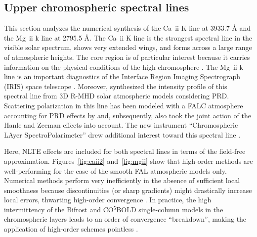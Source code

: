 \documentclass[iop,numberedappendix,twocolappendix,twocolumn]{emulateapj}
\begin{document}
\subsection{Upper chromospheric spectral lines}\label{subsec:5.3}
%
This section analyzes the numerical synthesis of the Ca~{\sc ii} K line at 3933.7 {\rm \AA} and the Mg~{\sc ii} k line at 2795.5 {\rm \AA}.
The Ca~{\sc ii} K line is the strongest spectral line in the visible solar spectrum,
shows very extended wings, and forms across a large range of atmospheric heights.
The core region is of particular interest because it carries information on the physical conditions of the high chromosphere
\citep[e.g.,][]{solanki1991,carlsson1997,solanki2004,anusha2013,bjorgen2018}.
The Mg~{\sc ii} k line is an important diagnostics of 
the Interface Region Imaging Spectrograph (IRIS) space telescope \citep{depontieu2014}.
Moreover, \citet{leenaarts2013a,leenaarts2013b} synthesized the intensity profile of this spectral line from 3D R-MHD solar atmospheric models considering PRD.
Scattering polarization in this line has been modeled with a FALC atmosphere accounting for PRD effects by \citet{belluzzi2012} and, subsequently,
\citet{alsinaballester2016} also took the joint action of the Hanle and Zeeman effects into account.
The new instrument ``Chromospheric LAyer SpectroPolarimeter''
drew additional interest toward this spectral line \citep[CLASP2,][]{narukage2016}.

Here, NLTE effects are included for both spectral lines in terms of the field-free approximation.
Figures~\ref{fig:caii2} and~\ref{fig:mgii} show that high-order methods are well-performing for the case of the smooth FAL atmospheric models only.
Numerical methods perform very inefficiently in the absence of sufficient local smoothness
because discontinuities (or sharp gradients) might drastically increase local errors,
thwarting high-order convergence \citep[e.g.,][]{dieci2012}.
In practice, the high intermittency of the Bifrost and CO$^5$BOLD single-column models
in the chromospheric layers leads to an order of convergence ``breakdown'',
making the application of high-order schemes pointless \citep[e.g.,][]{mannshardt1978}.
\end{document}
